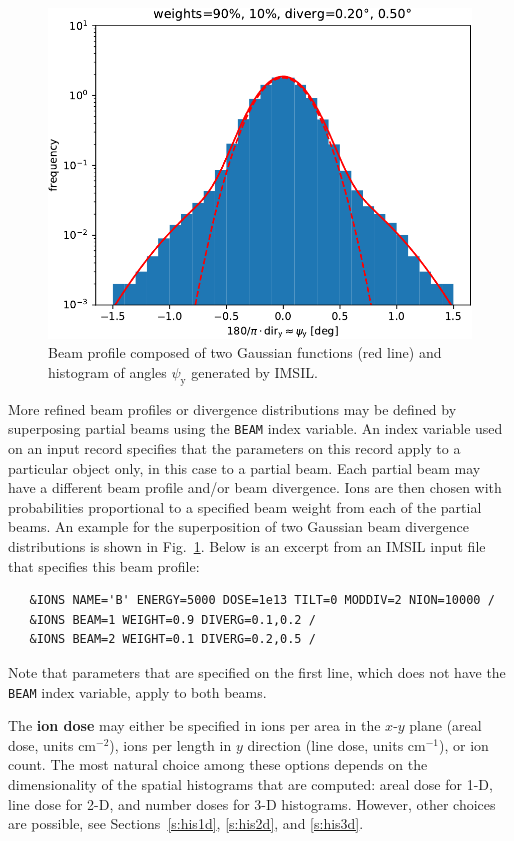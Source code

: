 \begin{figure}[htbp]
\centering
\noindent\includegraphics[scale=0.8]{diverg_y-crop.pdf}
\caption{Beam profile composed of two Gaussian functions (red line) and
histogram of angles \(\psi_\mathrm{y}\) generated by IMSIL.}
\label{fig:diverg}
\end{figure}  
%
More refined beam profiles or divergence distributions may be defined by
superposing partial beams using the \texttt{BEAM} index variable. An index
variable used on an input record specifies that the parameters on this record
apply to a particular object only, in this case to a partial beam. Each partial
beam may have a different beam profile and/or beam divergence. Ions are then
chosen with probabilities proportional to a specified beam weight from each of
the partial beams. An example for the superposition of two Gaussian beam
divergence distributions is shown in Fig.~\ref{fig:diverg}. Below is an excerpt
from an IMSIL input file that specifies this beam profile: 
%
\begin{verbatim}
   &IONS NAME='B' ENERGY=5000 DOSE=1e13 TILT=0 MODDIV=2 NION=10000 /
   &IONS BEAM=1 WEIGHT=0.9 DIVERG=0.1,0.2 /
   &IONS BEAM=2 WEIGHT=0.1 DIVERG=0.2,0.5 /
\end{verbatim}
%
Note that parameters that are specified on the first line, which does not have
the \texttt{BEAM} index variable, apply to both beams.

The \textbf{ion dose} may either be specified in ions per area in the $x$-$y$
plane (areal dose, units cm$^{-2}$), ions per length in $y$ direction (line
dose, units cm$^{-1}$), or ion count. The most natural choice among these
options depends on the dimensionality of the spatial histograms that are
computed: areal dose for 1-D, line dose for 2-D, and number doses for 3-D
histograms. However, other choices are possible, see Sections~\ref{s:his1d},
\ref{s:his2d}, and \ref{s:his3d}.

